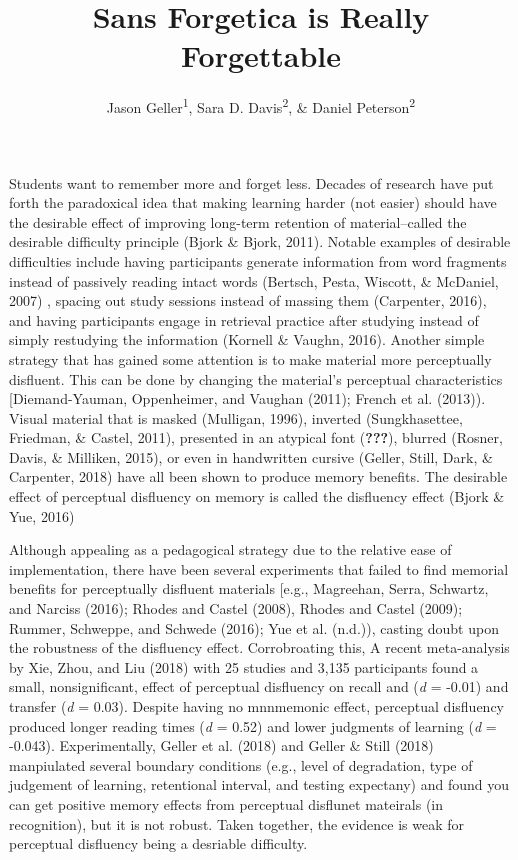 \documentclass[english,doc]{apa6}
\author{Jason Geller\textsuperscript{1}, Sara D. Davis\textsuperscript{2}, \& Daniel Peterson\textsuperscript{2}}
\affiliation{
\vspace{0.5cm}
\textsuperscript{1} University of Iowa\\\textsuperscript{2} Skidmore College}
\title{Sans Forgetica is Really Forgettable}
\date{}
\begin{document}
\maketitle

Students want to remember more and forget less. Decades of research have put forth the paradoxical idea that making learning harder (not easier) should have the desirable effect of improving long-term retention of material--called the desirable difficulty principle (Bjork \& Bjork, 2011). Notable examples of desirable difficulties include having participants generate information from word fragments instead of passively reading intact words (Bertsch, Pesta, Wiscott, \& McDaniel, 2007) , spacing out study sessions instead of massing them (Carpenter, 2016), and having participants engage in retrieval practice after studying instead of simply restudying the information (Kornell \& Vaughn, 2016). Another simple strategy that has gained some attention is to make material more perceptually disfluent. This can be done by changing the material's perceptual characteristics {[}Diemand-Yauman, Oppenheimer, and Vaughan (2011); French et al. (2013)). Visual material that is masked (Mulligan, 1996), inverted (Sungkhasettee, Friedman, \& Castel, 2011), presented in an atypical font ({\textbf{???}}), blurred (Rosner, Davis, \& Milliken, 2015), or even in handwritten cursive (Geller, Still, Dark, \& Carpenter, 2018) have all been shown to produce memory benefits. The desirable effect of perceptual disfluency on memory is called the disfluency effect (Bjork \& Yue, 2016)

Although appealing as a pedagogical strategy due to the relative ease of implementation, there have been several experiments that failed to find memorial benefits for perceptually disfluent materials {[}e.g., Magreehan, Serra, Schwartz, and Narciss (2016); Rhodes and Castel (2008), Rhodes and Castel (2009); Rummer, Schweppe, and Schwede (2016); Yue et al. (n.d.)), casting doubt upon the robustness of the disfluency effect. Corrobroating this, A recent meta-analysis by Xie, Zhou, and Liu (2018) with 25 studies and 3,135 participants found a small, nonsignificant, effect of perceptual disfluency on recall and (\emph{d} = -0.01) and transfer (\emph{d} = 0.03). Despite having no mnnmemonic effect, perceptual disfluency produced longer reading times (\emph{d} = 0.52) and lower judgments of learning (\emph{d} = -0.043). Experimentally, Geller et al. (2018) and Geller \& Still (2018) manpiulated several boundary conditions (e.g., level of degradation, type of judgement of learning, retentional interval, and testing expectany) and found you can get positive memory effects from perceptual disflunet mateirals (in recognition), but it is not robust. Taken together, the evidence is weak for perceptual disfluency being a desriable difficulty.
\end{document}
